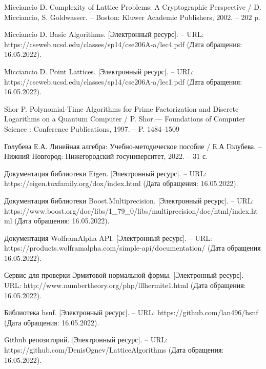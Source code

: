 \newpage


\begin{thebibliography}{10}


Micciancio D. Complexity of Lattice Problems: A Cryptographic Perspective / D. Micciancio, S. Goldwasser. -- Boston: Kluwer Academic Publishers, 2002. -- 202 p.

Micciancio D. Basic Algorithms. [Электронный ресурс]. -- URL: https://cseweb.ucsd.edu/classes/sp14/cse206A-a/lec4.pdf (Дата обращения: 16.05.2022).

Micciancio D. Point Lattices. [Электронный ресурс]. -- URL: https://cseweb.ucsd.edu/classes/sp14/cse206A-a/lec1.pdf (Дата обращения: 16.05.2022).

Shor P. Polynomial-Time Algorithms for Prime Factorization and Discrete Logarithms on a Quantum Computer / P. Shor.--- Foundations of Computer Science : Conference Publications, 1997. -- P. 1484–1509

Голубева Е.А. Линейная алгебра: Учебно-методическое
пособие / Е.А Голубева. -- Нижний Новгород: Нижегородский госуниверситет, 2022. -- 31 с.

Документация библиотеки Eigen. [Электронный ресурс]. -- URL: https://eigen.tuxfamily.org/dox/index.html (Дата обращения: 16.05.2022).

Документация библиотеки Boost.Multiprecision. [Электронный ресурс]. -- URL: https://www.boost.org/doc/libs/1\_79\_0/libs/multiprecision/doc/html/index.html (Дата обращения: 16.05.2022).

Документация WolframAlpha API. [Электронный ресурс]. -- URL: https://products.wolframalpha.com/simple-api/documentation/ (Дата обращения 16.05.2022).

Сервис для проверки Эрмитовой нормальной формы. [Электронный ресурс]. -- URL: http://www.numbertheory.org/php/lllhermite1.html (Дата обращения: 16.05.2022).

Библиотека hsnf. [Электронный ресурс]. -- URL: https://github.com/lan496/hsnf (Дата обращения: 16.05.2022).

Github репозиторий. [Электронный ресурс]. -- URL: https://github.com/DenisOgnev/Lat\-tice\-Algorithms (Дата обращения: 16.05.2022).
 

\end{thebibliography}

\clearpage